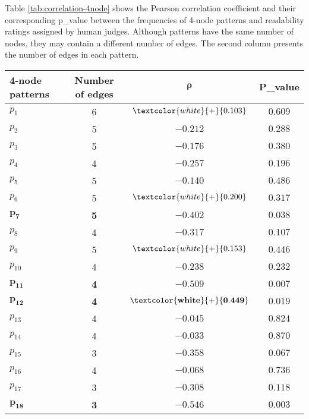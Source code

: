Table \ref{tab:correlation-4node} shows the Pearson correlation coefficient and their corresponding p\_value between the frequencies of 4-node patterns and readability ratings assigned by human judges. 
Although patterns have the same number of nodes, they may contain a different number of edges. 
The second column presents the number of edges in each pattern. 

\begin{table}[!ht]
	\begin{center}
		\begin{tabular}{lccc}
			\toprule
   			\textbf{4-node patterns}& \textbf{Number of edges} & $\boldsymbol\rho$ 		& \textbf{P\_value}				\\
   			\midrule
			$p_1$ 				& 6 			  & $\textcolor{white}{+}{0.103}$ 	& $0.609$					\\
			$p_2$ 				& 5 			  & $-0.212$ 					 	& $0.288$					\\
			$p_3$  				& 5				  & $-0.176$				     	& $0.380$					\\
			$p_4$  				& 4 			  & $-0.257$ 				     	& $0.196$					\\
			$p_5$ 				& 5 			  & $-0.140$ 					 	& $0.486$					\\
			$p_6$  				& 5 			  & $\textcolor{white}{+}{0.200}$  	& $0.317$					\\
			$\mathbf{p_7}$ 	& \textbf{5} 	  & $\mathbf{-0.402}$ 			 	& $\mathbf{0.038}$			\\
			$p_8$  				& 4 			  & $-0.317$ 					 	& $0.107$					\\
			$p_9$ 				& 5 			  & $\textcolor{white}{+}{0.153}$  	& $0.446$					\\
			$p_{10}$ 			& 4 			  & $-0.238$ 					 	& $0.232$					\\
			$\mathbf{p_{11}}$ 	& \textbf{4} 	  & $\mathbf{-0.509}$            	& $\mathbf{0.007}$			\\
			$\mathbf{p_{12}}$  	& \textbf{4} 	  & $\mathbf{\textcolor{white}{+}{0.449}}$ & $\mathbf{0.019}$	\\
			$p_{13}$			& 4 			  & $-0.045$ 						& $0.824$					\\
			$p_{14}$			& 4 			  & $-0.033$ 						& $0.870$					\\
			$p_{15}$			& 3				  & $-0.358$ 						& $0.067$					\\
			$p_{16}$ 			& 4 			  & $-0.068$ 						& $0.736$					\\
			$p_{17}$			& 3 			  & $-0.308$ 						& $0.118$					\\
			$\mathbf{p_{18}}$	& \textbf{3}	  & $\mathbf{-0.546}$				& $\mathbf{0.003}$			\\

\end{tabular}
\end{center}
\end{table}

